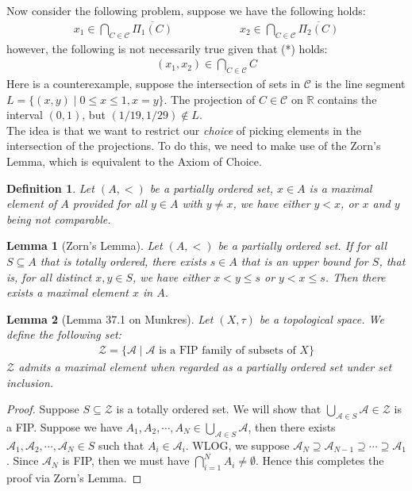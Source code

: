 \documentclass[11pt]{book}
\theoremstyle{break}
\theoremstyle{break}
\newtheorem{lem}{Lemma}[thm]
\newtheorem{defn}{Definition}[corL]
\newcommand{\R}{\mathbb{R}}
\begin{document}
Now consider the following problem, suppose we have the following holds:
\begin{align*}
x_1 \in \bigcap_{C \in \mathcal{C}} \overline{\Pi_1(C)} \qquad\qquad\qquad x_2 \in \bigcap_{C \in \mathcal{C}}\overline{\Pi_2(C)}  \tag{*}
\end{align*}
however, the following is not necessarily true given that (*) holds:
\begin{align*}
(x_1,x_2) \in \bigcap_{C \in \mathcal{C}}C
\end{align*}
Here is a counterexample, suppose the intersection of sets in $\mathcal{C}$ is the line segment $L=\{(x,y) \mid 0\leq x\leq 1, x=y\}$. The projection of $C\in \mathcal{C}$ on $\R$ contains the interval $(0,1)$, but $(1/19, 1/29) \notin L$. \\

The idea is that we want to restrict our \textit{choice} of picking elements in the intersection of the projections. To do this, we need to make use of the Zorn's Lemma, which is equivalent to the Axiom of Choice. \\


\begin{defn}
Let $(A,<)$ be a partially ordered set, $x \in A$ is a maximal element of $A$ provided for all $y \in A$ with $y \neq x$, we have either $y<x$, or $x$ and $y$ being not comparable. 
\end{defn}

\begin{lem}[Zorn's Lemma]
Let $(A,<)$ be a partially ordered set. If for all $S\subseteq A$ that is totally ordered, there exists $s \in A$ that is an upper bound for $S$, that is, for all distinct $x,y \in S$, we have either $x<y\leq s$ or $y<x \leq s$. Then there exists a maximal element $x$ in $A$.
\end{lem}

\begin{lem}[Lemma 37.1 on Munkres]
Let $(X,\tau)$ be a topological space. We define the following set:
\begin{align}
\mathcal{Z} = \{\mathcal{A}\mid \mathcal{A} \text{ is a FIP family of subsets of }X\}
\end{align}
$\mathcal{Z}$ admits a maximal element when regarded as a partially ordered set under set inclusion. 
\end{lem}
\begin{proof}
Suppose $S\subseteq \mathcal{Z}$ is a totally ordered set. We will show that $\bigcup_{\mathcal{A} \in S}\mathcal{A} \in \mathcal{Z}$ is a FIP. Suppose we have $A_1,A_2,\cdots, A_N \in \bigcup_{\mathcal{A} \in S}\mathcal{A}$, then there exists $\mathcal{A}_1,\mathcal{A}_2,\cdots, \mathcal{A}_N \in S$ such that $A_i \in \mathcal{A}_i$. WLOG, we suppose $\mathcal{A}_N \supseteq \mathcal{A}_{N-1} \supseteq \cdots \supseteq \mathcal{A}_1$. Since $\mathcal{A}_N$ is FIP, then we must have $\bigcap_{i=1}^N A_i \neq \emptyset$. Hence this completes the proof via Zorn's Lemma. 
\end{proof}
\end{document}
